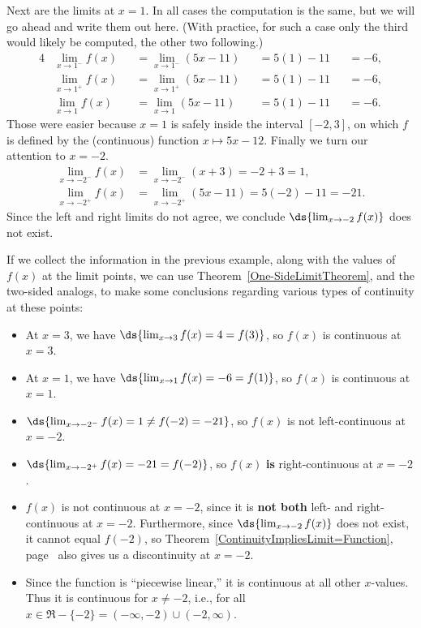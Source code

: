 Next are the limits at $x=1$.  In all cases the computation
is the same, but we will go ahead and write them out here.
(With practice, for such a case only the third would likely be
computed, the other two following.)
\begin{alignat*}{4}
&\lim_{x\to1^-}f(x)&&=\lim_{x\to1^-}(5x-11)&&=5(1)-11&&=-6,\\
&\lim_{x\to1^+}f(x)&&=\lim_{x\to1^+}(5x-11)&&=5(1)-11&&=-6,\\
&\lim_{x\to1}f(x)&&=\lim_{x\to1}(5x-11)&&=5(1)-11&&=-6.
\end{alignat*}
Those were easier because $x=1$ is safely inside the interval
$[-2,3]$, on which $f$ is defined by the (continuous) function
$x\longmapsto5x-12$.
Finally we turn our attention to $x=-2$.
\begin{align*}
\lim_{x\to-2^-}f(x)&=\lim_{x\to-2^-}(x+3)=-2+3=1,\\
\lim_{x\to-2^+}f(x)&=\lim_{x\to-2^+}(5x-11)
  =5(-2)-11=-21.\end{align*}
Since the left and right limits do not agree, we conclude
$\ds{\lim_{x\to-2}f(x)}$ does not exist.
\label{PiecewiseContinuousExample}\eex

If we collect the information in the previous example, along
with the values of $f(x)$ at the limit points, we can 
use Theorem~\ref{One-SideLimitTheorem}, and the
two-sided analogs, to make some 
conclusions regarding various types of  continuity at these points:
\begin{itemize}
\item At $x=3$, we have $\ds{\lim_{x\to3}f(x)=4=f(3)}$, so
      $f(x)$ is continuous at $x=3$.
\item At $x=1$, we have $\ds{\lim_{x\to1}f(x)=-6=f(1)}$, so
      $f(x)$ is continuous at $x=1$.
\item $\ds{\lim_{x\to-2^-}f(x)=1\ne f(-2)=-21}$, so 
      $f(x)$ is not left-continuous at $x=-2$.
\item $\ds{\lim_{x\to-2^+}f(x)=-21=f(-2)}$, so 
      $f(x)$ {\bf is} right-continuous at $x=-2$.
\item $f(x)$ is not continuous at $x=-2$, since it is {\bf not both}
      left- and right-continuous at $x=-2$.  Furthermore,
      since $\ds{\lim_{x\to-2}f(x)}$ does not exist, it cannot
      equal $f(-2)$, so Theorem~\ref{ContinuityImpliesLimit=Function},
      page~\pageref{ContinuityImpliesLimit=Function}
      also gives us a discontinuity at $x=-2$.
\item Since the function is ``piecewise linear,'' it is continuous
      at all other $x$-values.  Thus it is continuous for $x\ne-2$,
      i.e., for all $x\in \Re-\{-2\}=(-\infty,-2)\cup(-2,\infty)$.
\end{itemize}




